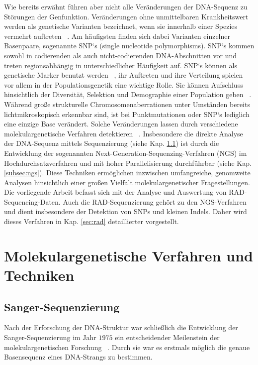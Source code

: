 Wie bereits erwähnt führen aber nicht alle Veränderungen der DNA-Sequenz zu Störungen der Genfunktion. Veränderungen ohne unmittelbaren Krankheitswert werden als genetische Varianten bezeichnet, wenn sie innerhalb einer Spezies vermehrt auftreten ~\cite{vignal_2002, sachidanandam_2001}. Am häufigsten finden sich dabei Varianten einzelner Basenpaare, sogenannte SNP‘s (single nucleotide polymorphisms). SNP‘s kommen sowohl in codierenden als auch nicht-codierenden DNA-Abschnitten vor und treten regionsabhängig in unterschiedlicher Häufigkeit auf. SNP‘s können als genetische Marker benutzt werden ~\cite{kruglyak_1997, kwok_2003}, ihr Auftreten und ihre Verteilung spielen vor allem in der Populationsgenetik eine wichtige Rolle. Sie können Aufschluss hinsichtlich der Diversität, Selektion und Demographie einer Population geben ~\cite{nielsen_2004, shriver_2004, akey_2002}. \\

Während große strukturelle Chromosomenaberrationen unter Umständen bereits lichtmikroskopisch erkennbar sind, ist bei Punktmutationen oder SNP‘s lediglich eine einzige Base verändert. Solche Veränderungen lassen durch verschiedene molekulargenetische Verfahren detektieren ~\cite{kwok_2003, wang_1998}. Insbesondere die direkte Analyse der DNA-Sequenz mittels Sequenzierung  (siehe Kap. \ref{subsec:sanger}) ist durch die Entwicklung der sogenannten Next-Generation-Sequenzing-Verfahren (NGS) im Hochdurchsatzverfahren und mit hoher Parallelisierung durchführbar (siehe Kap. \ref{subsec:ngs}). Diese Techniken ermöglichen inzwischen umfangreiche, genomweite Analysen hinsichtlich einer großen Vielfalt molekulargenetischer Fragestellungen. Die vorliegende Arbeit befasst sich mit der Analyse und Auswertung von RAD-Sequencing-Daten. Auch die RAD-Sequenzierung gehört zu den NGS-Verfahren und dient insbesondere der Detektion von SNPs und kleinen Indels. Daher wird dieses Verfahren in Kap. \ref{sec:rad} detaillierter vorgestellt.\\

\section{Molekulargenetische Verfahren und Techniken} \label{sec:methods}
\subsection{Sanger-Sequenzierung} \label{subsec:sanger}

Nach der Erforschung der DNA-Struktur war schließlich die Entwicklung der Sanger-Sequenzierung im Jahr $1975$ ein entscheidender Meilenstein der molekulargenetischen Forschung ~\cite{sanger_1975}. Durch sie war es erstmals möglich die genaue Basensequenz eines DNA-Strangs zu bestimmen. \\

